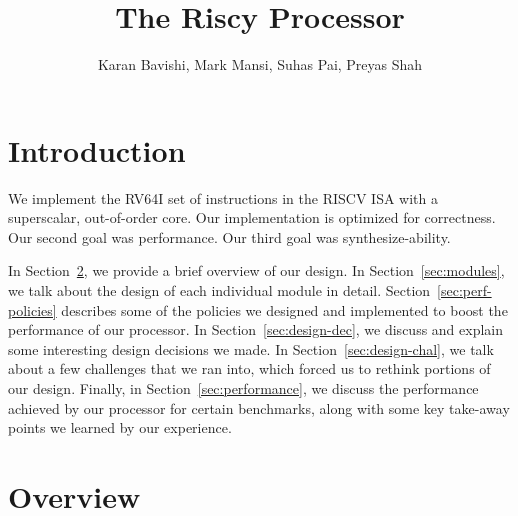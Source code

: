 \documentclass{article}
\title{The Riscy Processor}
\author{Karan Bavishi, Mark Mansi, Suhas Pai, Preyas Shah}
\date{}
\begin{document}
\maketitle

\section{Introduction}

We implement the RV64I set of instructions in the RISCV ISA\cite{riscv-isa}
with a superscalar, out-of-order core. Our implementation is optimized for
correctness. Our second goal was performance.  Our third goal was
synthesize-ability.

In Section~\ref{sec:overview}, we provide a brief overview of our design. In
Section~\ref{sec:modules}, we talk about the design of each individual module
in detail. Section~\ref{sec:perf-policies} describes some of the policies we
designed and implemented to boost the performance of our processor. In
Section~\ref{sec:design-dec}, we discuss and explain some interesting design
decisions we made. In Section~\ref{sec:design-chal}, we talk about a few
challenges that we ran into, which forced us to rethink portions of our design.
Finally, in Section~\ref{sec:performance}, we discuss the performance achieved
by our processor for certain benchmarks, along with some key take-away points
we learned by our experience.

\section{Overview}
\label{sec:overview}
\end{document}
